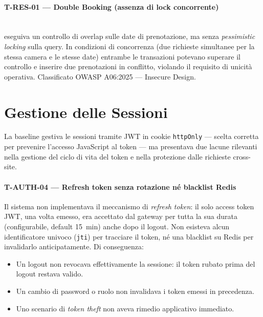 ﻿\documentclass[a4paper,12pt]{report}
\begin{document}
\paragraph{T-RES-01 — Double Booking (assenza di lock concorrente)}\mbox{}\\
\texttt{} eseguiva un controllo di overlap
sulle date di prenotazione, ma senza \emph{pessimistic locking} sulla query.
In condizioni di concorrenza (due richieste simultanee per la stessa camera e le
stesse date) entrambe le transazioni potevano superare il controllo e inserire due
prenotazioni in conflitto, violando il requisito di unicità operativa.
Classificato OWASP A06:2025 --- Insecure Design.

\section{Gestione delle Sessioni}

La baseline gestiva le sessioni tramite JWT in cookie \texttt{httpOnly} --- scelta
corretta per prevenire l'accesso JavaScript al token --- ma presentava due lacune
rilevanti nella gestione del ciclo di vita del token e nella protezione dalle
richieste cross-site.

\paragraph{T-AUTH-04 — Refresh token senza rotazione né blacklist Redis}
Il sistema non implementava il meccanismo di \emph{refresh token}: il solo access token
JWT, una volta emesso, era accettato dal gateway per tutta la sua durata (configurabile,
default 15~min) anche dopo il logout. Non esisteva alcun identificatore univoco
(\texttt{jti}) per tracciare il token, né una blacklist su Redis per invalidarlo
anticipatamente. Di conseguenza:

\begin{itemize}
  \item Un logout non revocava effettivamente la sessione: il token rubato prima del
        logout restava valido.
  \item Un cambio di password o ruolo non invalidava i token emessi in precedenza.
  \item Uno scenario di \emph{token theft} non aveva rimedio applicativo immediato.
\end{itemize}
\end{document}
